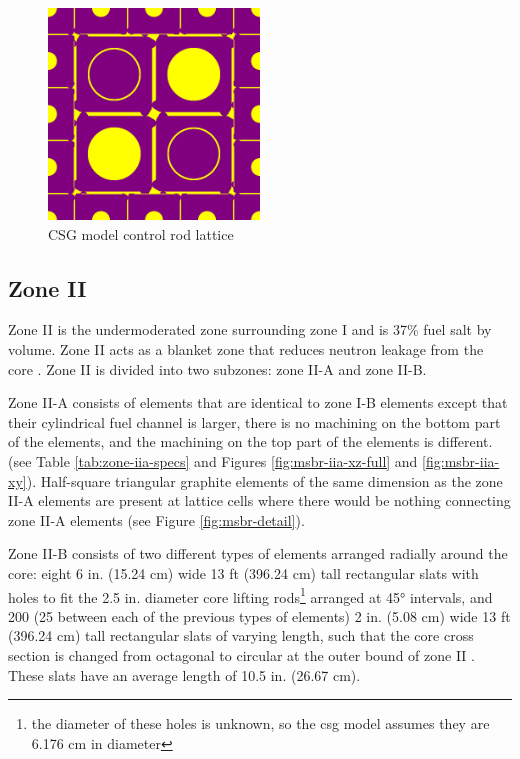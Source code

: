 \begin{figure}[htpb]
    \centering
    \includegraphics[width=0.5\textwidth]{figs/ch4/cr_xy_openmc.png}
    \caption{CSG model control rod lattice}
    \label{fig:control-rods}
\end{figure}


\subsection{Zone II}

Zone II is the undermoderated zone surrounding zone I and is 37\% fuel salt by
volume. Zone II acts as a blanket zone that reduces neutron leakage from the
core \cite{robertson_conceptual_1971}. Zone II is divided into two subzones: zone
II-A and zone II-B.

Zone II-A consists of elements that are identical to zone I-B elements except
that their cylindrical fuel channel is larger, there is no machining on the bottom part of the elements, and the machining on the top part of the elements is different. (see Table \ref{tab:zone-iia-specs} and Figures \ref{fig:msbr-iia-xz-full} and \ref{fig:msbr-iia-xy}). Half-square triangular graphite elements of the same dimension as the zone II-A elements are present at lattice cells where there would be nothing connecting zone II-A elements (see Figure \ref{fig:msbr-detail}). 

Zone II-B consists of two different types of elements arranged radially around the core: eight 6 in. (15.24 \unit{\centi\metre}) wide 13 ft (396.24 \unit{\centi\metre}) tall rectangular slats with holes to fit the 2.5 in. diameter core lifting rods\footnote{the diameter of these holes is unknown, so the \Gls{csg} model assumes they are 6.176 cm in diameter} arranged at 45\unit{\degree} intervals, and 200 (25 between each of the previous types of elements) 2 in. (5.08 \unit{\centi\metre}) wide 13 ft (396.24 \unit{\centi\metre})
tall rectangular slats of varying length, such that the core cross section is
changed from octagonal to circular at the outer bound of zone
II \cite{robertson_conceptual_1971}. These slats have an average length of 10.5
in. (26.67 \unit{\centi\metre}).

